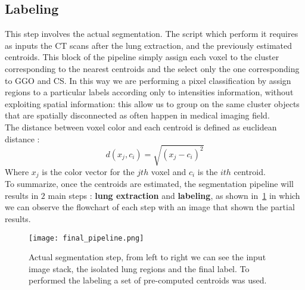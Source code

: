 \documentclass{standalone}
\begin{document}
	\subsection*{Labeling}
	
	This step involves the actual segmentation. The script which perform it requires as inputs the CT scans after the lung extraction, and the previously estimated centroids. This block of the pipeline simply assign each voxel to the cluster corresponding to the nearest centroids and the select only the one corresponding to GGO and CS. In this way we are performing a pixel classification by assign regions to a particular labels according only to intensities information, without exploiting spatial information: this allow us to group on the same cluster objects that are spatially disconnected as often happen in medical imaging field.\\
	The distance between voxel color and each centroid is defined as euclidean distance :
	\begin{equation*}
		d(x_j, c_i) = \sqrt{(x_j - c_i)^2}
	\end{equation*} 
	Where $x_j$ is the color vector for the $jth$ voxel and $c_i$ is the $ith$ centroid.\\
	
	To summarize, once the centroids are estimated, the segmentation pipeline will results in $2$ main steps : \textbf{lung extraction} and \textbf{labeling}, as shown in \figurename\,\ref{fig:FinalPipeline} in which we can observe the flowchart of each step with an image that shown the partial results.
	
	\begin{figure}
		\centering
			\texttt{[image: final\_pipeline.png]}
			\caption{Actual segmentation step, from left to right we can see the input image stack, the isolated lung regions and the final label. To performed the labeling a set of pre-computed centroids was used.}\label{fig:FinalPipeline}
	\end{figure}
	
	
	
\end{document}

